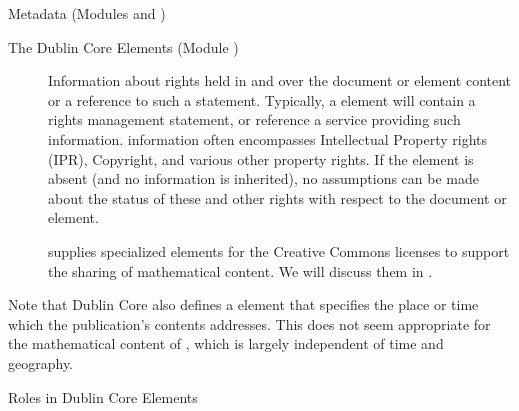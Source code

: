 \begin{tchapter}[id=metadata,short=Metadata]{Metadata (Modules {} and  {})}
\begin{tsection}[id=dc-elements]{The Dublin Core Elements (Module {})}
\begin{description}
\item[{}] Information about rights held in and over the
  document or element content or a reference to such a statement. Typically, a
  {} element will contain a rights management statement, or
  reference a service providing such information. {}
  information often encompasses Intellectual Property rights (IPR), Copyright, and various
  other property rights. If the {} element is absent (and no
  {} information is inherited), no assumptions can be made
  about the status of these and other rights with respect to the document or element.
  
  {\omdoc} supplies specialized elements for the Creative Commons licenses to support the
  sharing of mathematical content. We will discuss them in {}.
\end{description}
Note that Dublin Core also defines a {} element that specifies
the place or time which the publication's contents addresses. This does not seem
appropriate for the mathematical content of {\omdoc}, which is largely independent of time
and geography.  

\end{tsection}

\begin{tsection}[id=dc-roles]{Roles in Dublin Core Elements}


\end{tsection}
\end{tchapter}
